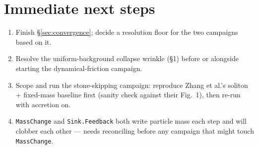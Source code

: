 \documentclass[11pt]{article}
\newcommand{\code}[1]{\texttt{#1}}
\begin{document}
\section{Immediate next steps}

\begin{enumerate}
  \item Finish \S\ref{sec:convergence}; decide a resolution floor for the
    two campaigns based on it.
  \item Resolve the uniform-background collapse wrinkle (\S1) before or
    alongside starting the dynamical-friction campaign.
  \item Scope and run the stone-skipping campaign: reproduce Zhang et al.'s
    soliton + fixed-mass baseline first (sanity check against their Fig.~1),
    then re-run with accretion on.
  \item \code{MassChange} and \code{Sink.Feedback} both write particle mass
    each step and will clobber each other — needs reconciling before any
    campaign that might touch \code{MassChange}.
\end{enumerate}
\end{document}
